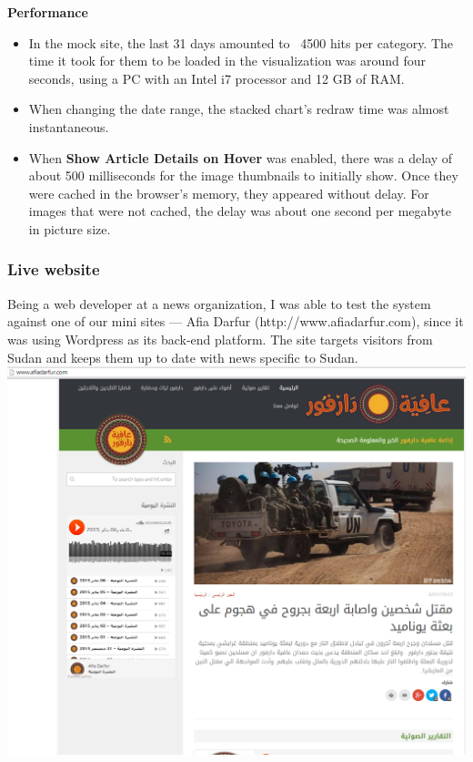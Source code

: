 \documentclass[12pt]{article}
\begin{document}
{\noindent\textbf{Performance}
\begin{itemize}
\item In the mock site, the last 31 days amounted to ~4500 hits per category. The time it took for them to be loaded in the visualization was around four seconds, using a PC with an Intel i7 processor and 12 GB of RAM.
\item When changing the date range, the stacked chart's redraw time was almost instantaneous.
\item When \textbf{Show Article Details on Hover} was enabled, there was a delay of about 500 milliseconds for the image thumbnails to initially show. Once they were cached in the browser's memory, they appeared without delay. For images that were not cached, the delay was about one second per megabyte in picture size.
\end{itemize}

\newpage

\subsubsection{Live website}
Being a web developer at a news organization, I was able to test the system against one of our mini sites --- Afia Darfur (http://www.afiadarfur.com), since it was using Wordpress as its back-end platform. The site targets visitors from Sudan and keeps them up to date with news specific to Sudan. \\

\noindent\includegraphics[scale=0.4]{img/afiadarfur_main} \\

}
\end{document}
